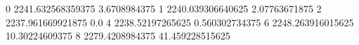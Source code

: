 0 2241.632568359375 3.6708984375
1 2240.039306640625 2.07763671875
2 2237.961669921875 0.0
4 2238.52197265625 0.560302734375
6 2248.263916015625 10.30224609375
8 2279.4208984375 41.459228515625

